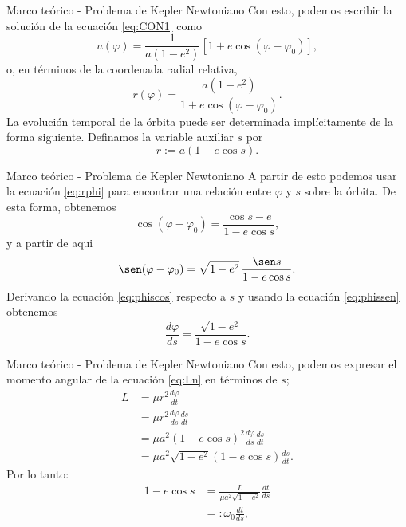 \begin{frame}{Marco teórico - Problema de Kepler Newtoniano}
    Con esto, podemos escribir la solución de la ecuación \ref{eq:CON1} como 
\begin{equation}
    u(\varphi)=\frac{1}{a(1-e^2)}\left[1+e\cos
    (\varphi-\varphi_0)\right],
    \end{equation}
    o, en términos de la coordenada radial relativa,
    \begin{equation}\label{eq:rphi}
    r(\varphi)=\frac{a(1-e^2)}{1+e\cos(\varphi-\varphi_0)}.
\end{equation}
La evolución temporal de la órbita puede ser determinada implícitamente de la forma siguiente. Definamos la variable auxiliar
$s$ por
\begin{equation}\label{eq:rs}
    r:=a(1-e\cos s).
\end{equation}
\end{frame}
\begin{frame}{Marco teórico - Problema de Kepler Newtoniano}
    A partir de esto podemos usar la ecuación \ref{eq:rphi} para encontrar una relación entre $\varphi$ y $s$ sobre la órbita.
De esta forma, obtenemos 
\begin{equation}\label{eq:phiscos}
    \cos(\varphi-\varphi_0)=\frac{\cos s -e}{1-e\cos s},
\end{equation}
y a partir de aqui
\begin{equation}\label{eq:phissen}
    \sen(\varphi-\varphi_0)=\sqrt{1-e^2}\,\frac{\sen s}{1-e\cos s}.
\end{equation}
Derivando la ecuación \ref{eq:phiscos} respecto a $s$ y usando la ecuación \ref{eq:phissen} obtenemos 
\begin{equation*}
    \frac{d\varphi}{ds}=\frac{\sqrt{1-e^2}}{1-e\cos s}.
\end{equation*}
\end{frame}
\begin{frame}{Marco teórico - Problema de Kepler Newtoniano}
    \vspace{0.3cm}
    Con esto, podemos expresar el momento angular de la ecuación \ref{eq:Ln} en términos de $s$;
\begin{align*}
    L & = \mu r^2 \frac{d\varphi}{dt} \\
    & = \mu r^2 \frac{d\varphi}{ds}\frac{ds}{dt} \\
    & = \mu a^2\left(1-e\cos s\right)^2 \frac{d\varphi}{ds}\frac{ds}{dt} \\
    & = \mu a^2\sqrt{1-e^2}\left(1-e\cos s\right) \frac{ds}{dt} .
\end{align*}
Por lo tanto:
\begin{align*}
    1-e\cos s & = \frac{L}{\mu a^2\sqrt{1-e^2}} \frac{dt}{ds} \\
    & =: \omega_0 \frac{dt}{ds},
\end{align*}
\end{frame}
